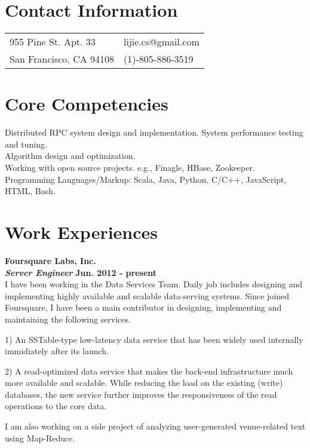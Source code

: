 \documentclass[margin,line]{res}
\begin{document}

\begin{resume}
\section{\sc Contact Information}
\vspace{.05in}
\begin{tabular}{@{}p{2in}p{4in}}
955 Pine St. Apt. 33 & lijie.cs@gmail.com \\
San Francisco, CA 94108 & (1)-805-886-3519 \\
\end{tabular}

\section{\sc Core Competencies}
Distributed RPC system design and implementation. System performance testing and tuning. \\
Algorithm design and optimization. \\
Working with open source projects. e.g., Finagle, HBase, Zookeeper. \\
Programming Languages/Markup: Scala, Java, Python, C/C++, JavaScript, HTML, Bash.

\section{\sc Work Experiences}
{\bf{Foursquare Labs, Inc.}}\\
{\bf{\em Server Engineer}} \hfill {\bf Jun. 2012 - present}\\
I have been working in the Data Services Team. Daily job includes designing and implementing highly available and scalable data-serving systems. Since joined Foursquare, I have been a main contributor in designing, implementing and maintaining the following services.

1) An SSTable-type low-latency data service that has been widely used internally immidiately after its launch.

2) A read-optimized data service that makes the back-end infrastructure much more available and scalable. While reducing the load on the existing (write) databases, the new service further improves the responsiveness of the read operations to the core data.

I am also working on a side project of analyzing user-generated venue-related text using Map-Reduce.


\end{resume}
\end{document}
